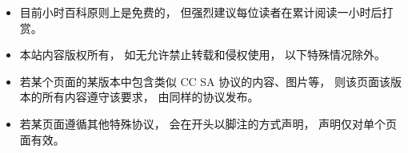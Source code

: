 
\begin{itemize}
\item 目前小时百科原则上是免费的， 但强烈建议每位读者在累计阅读一小时后打赏。
\item 本站内容版权所有， 如无允许禁止转载和侵权使用， 以下特殊情况除外。
\item 若某个页面的某版本中包含类似 CC SA 协议的内容、图片等， 则该页面该版本的所有内容遵守该要求， 由同样的协议发布。
\item 若某页面遵循其他特殊协议， 会在开头以脚注的方式声明， 声明仅对单个页面有效。
\end{itemize}

